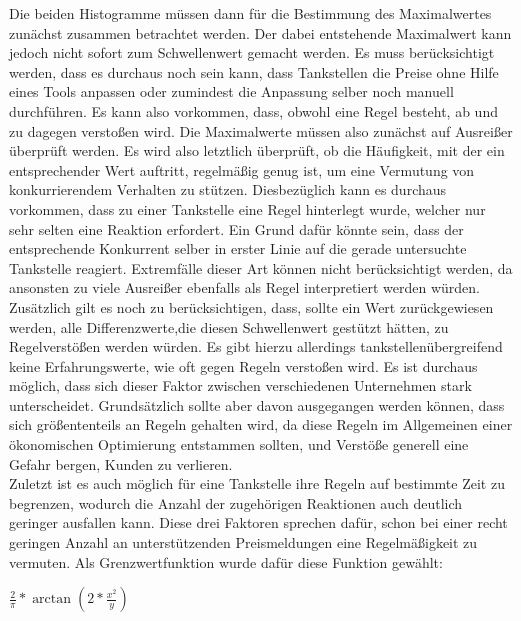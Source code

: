 Die beiden Histogramme müssen dann für die Bestimmung des Maximalwertes zunächst zusammen betrachtet werden. Der dabei entstehende Maximalwert kann jedoch nicht sofort zum Schwellenwert gemacht werden. Es muss berücksichtigt werden, dass es durchaus noch sein kann, dass Tankstellen die Preise ohne Hilfe eines Tools anpassen oder zumindest die Anpassung selber noch manuell durchführen. Es kann also vorkommen, dass, obwohl eine Regel besteht, ab und zu dagegen verstoßen wird. Die Maximalwerte müssen also zunächst auf Ausreißer überprüft werden. Es wird also letztlich überprüft, ob die Häufigkeit, mit der ein entsprechender Wert auftritt, regelmäßig genug ist, um eine Vermutung von konkurrierendem Verhalten zu stützen. Diesbezüglich kann es durchaus vorkommen, dass zu einer Tankstelle eine Regel hinterlegt wurde, welcher nur sehr selten eine Reaktion erfordert. Ein Grund dafür könnte sein, dass der entsprechende Konkurrent selber in erster Linie auf die gerade untersuchte Tankstelle reagiert. Extremfälle dieser Art können nicht berücksichtigt werden, da ansonsten zu viele Ausreißer ebenfalls als Regel interpretiert werden würden.\\
Zusätzlich gilt es noch zu berücksichtigen, dass, sollte ein Wert zurückgewiesen werden, alle Differenzwerte,die diesen Schwellenwert gestützt hätten, zu Regelverstößen werden würden. Es gibt hierzu allerdings tankstellenübergreifend keine Erfahrungswerte, wie oft gegen Regeln verstoßen wird. Es ist durchaus möglich, dass sich dieser Faktor zwischen verschiedenen Unternehmen stark unterscheidet. Grundsätzlich sollte aber davon ausgegangen werden können, dass sich größententeils an Regeln gehalten wird, da diese Regeln im Allgemeinen einer ökonomischen Optimierung entstammen sollten, und Verstöße generell eine Gefahr bergen, Kunden zu verlieren.\\
Zuletzt ist es auch möglich für eine Tankstelle ihre Regeln auf bestimmte Zeit zu begrenzen, wodurch die Anzahl der zugehörigen Reaktionen auch deutlich geringer ausfallen kann. Diese drei Faktoren sprechen dafür, schon bei einer recht geringen Anzahl an unterstützenden Preismeldungen eine Regelmäßigkeit zu vermuten. Als Grenzwertfunktion wurde dafür diese Funktion gewählt:
\begin{center}
$ \frac{2}{\pi}*\arctan(2*\frac{x^2}{y})$\\
\end{center}
